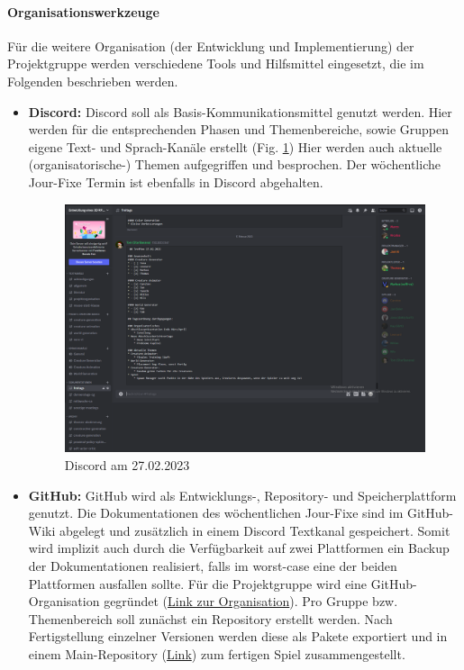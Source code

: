 \paragraph{Organisationswerkzeuge}
Für die weitere Organisation (der Entwicklung und Implementierung) der Projektgruppe werden verschiedene Tools und Hilfsmittel eingesetzt, die im Folgenden beschrieben werden.

\begin{itemize}
	\item \textbf{Discord: } Discord soll als Basis-Kommunikationsmittel genutzt werden. Hier werden für die entsprechenden Phasen und Themenbereiche, sowie Gruppen eigene Text- und Sprach-Kanäle erstellt (Fig. \ref{fig:discord}) Hier werden auch aktuelle (organisatorische-) Themen aufgegriffen und besprochen. Der wöchentliche Jour-Fixe Termin ist ebenfalls in Discord abgehalten.
	\begin{figure}
		\centering
		\includegraphics[width=0.7\linewidth]{resources/img/Discord.png}
		\caption{Discord am 27.02.2023}
		\label{fig:discord}
	\end{figure}
	\item \textbf{GitHub: } GitHub wird als Entwicklungs-, Repository- und Speicherplattform genutzt. Die Dokumentationen des wöchentlichen Jour-Fixe sind im GitHub-Wiki abgelegt und zusätzlich in einem Discord Textkanal gespeichert. Somit wird implizit auch durch die Verfügbarkeit auf zwei Plattformen ein Backup der Dokumentationen realisiert, falls im worst-case eine der beiden Plattformen ausfallen sollte. Für die Projektgruppe wird eine GitHub-Organisation gegründet (\href{https://github.com/PG649-3D-RPG}{Link zur Organisation}). Pro Gruppe bzw. Themenbereich soll zunächst ein Repository erstellt werden. Nach Fertigstellung einzelner Versionen werden diese als Pakete exportiert und in einem Main-Repository (\href{https://github.com/PG649-3D-RPG/Horror-Survival-RPG}{Link}) zum fertigen Spiel zusammengestellt.

\end{itemize}
